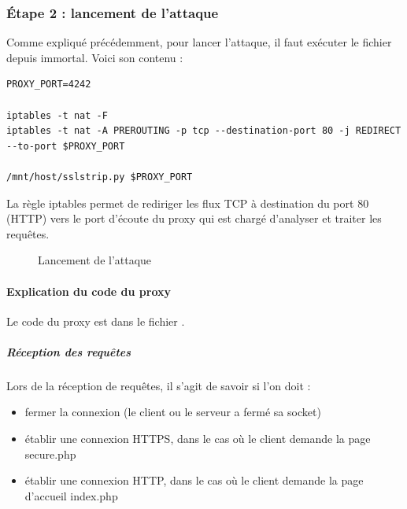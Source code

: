 \subsubsection{Étape 2 : lancement de l'attaque}

Comme expliqué précédemment, pour lancer l'attaque, il faut exécuter le fichier  depuis immortal. Voici son contenu :

\begin{verbatim}
PROXY_PORT=4242

iptables -t nat -F
iptables -t nat -A PREROUTING -p tcp --destination-port 80 -j REDIRECT --to-port $PROXY_PORT

/mnt/host/sslstrip.py $PROXY_PORT
\end{verbatim}

La règle iptables permet de rediriger les flux TCP à destination du port 80 (HTTP) vers le port d'écoute du proxy qui est chargé d'analyser et traiter les requêtes.

\begin{figure}[H]
  \caption{Lancement de l'attaque}
\end{figure}

\paragraph{Explication du code du proxy \\}

Le code du proxy est dans le fichier .

\subparagraph{Réception des requêtes \\}

Lors de la réception de requêtes, il s'agit de savoir si l'on doit :

\begin{itemize}
\item fermer la connexion (le client ou le serveur a fermé sa socket)
\item établir une connexion HTTPS, dans le cas où le client demande la page secure.php
\item établir une connexion HTTP, dans le cas où le client demande la page d'accueil index.php
\end{itemize}

